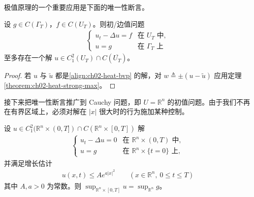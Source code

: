 \documentclass[../../main.tex]{subfiles}
\begin{document}
极值原理的一个重要应用是下面的唯一性断言。

\begin{theorem}[有界区域上的唯一性]\label{theorem:ch02-heat-uniqueness-bounded}设 $g\in C(\Gamma_T)$，$f\in C(U_T)$。则初/边值问题
\begin{align}\label{align:ch02-heat-bvp}
\begin{cases}
u_t-\Delta u=f & \text{在 }U_T\text{ 中},\\
u=g & \text{在 }\Gamma_T\text{ 上}
\end{cases}
\end{align}
至多存在一个解 $u\in C^2_1(U_T)\cap C(\overline{U_T})$。
\end{theorem}

\begin{proof}
若 $u$ 与 $\widetilde{u}$ 都是\eqref{align:ch02-heat-bvp} 的解，对 $w\triangleq\pm(u-\widetilde{u})$ 应用定理\cref{theorem:ch02-heat-strong-max}。
\end{proof}

接下来把唯一性断言推广到 Cauchy 问题，即 $U=\mathbb{R}^n$ 的初值问题。由于我们不再在有界区域上，必须对解在 $|x|$ 很大时的行为施加某种控制。

\begin{theorem}\label{theorem:ch02-heat-cauchy-max}设 $u\in C^2_1(\mathbb{R}^n\times(0,T])\cap C(\mathbb{R}^n\times[0,T])$ 解
\begin{align}\label{align:ch02-heat-cauchy}
\begin{cases}
u_t-\Delta u=0 & \text{在 }\mathbb{R}^n\times(0,T)\text{ 中},\\
u=g & \text{在 }\mathbb{R}^n\times\{t=0\}\text{ 上},
\end{cases}
\end{align}
并满足增长估计
\begin{align}\label{align:ch02-heat-growth}
u(x,t)\leqslant A e^{a|x|^2} \qquad (x\in\mathbb{R}^n,\ 0\leqslant t\leqslant T)
\end{align}
其中 $A,a>0$ 为常数。则 $\sup_{\mathbb{R}^n\times[0,T]}u=\sup_{\mathbb{R}^n}g$。
\end{theorem}
\end{document}
